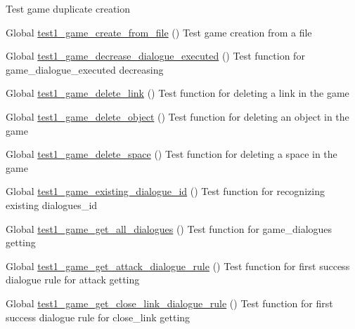 \begin{DoxyRefList}
%
Test game duplicate creation  
\item[Global \mbox{\hyperlink{game__test_8c_a867d2e7bebdfa55ee8b8a73764c46f5b}{test1\+\_\+game\+\_\+create\+\_\+from\+\_\+file}} ()]\label{test__test000141}%
%
Test game creation from a file  
\item[Global \mbox{\hyperlink{game__test_8c_aeb32195428035569b401f2b69428a06c}{test1\+\_\+game\+\_\+decrease\+\_\+dialogue\+\_\+executed}} ()]\label{test__test000307}%
%
Test function for game\+\_\+dialogue\+\_\+executed decreasing  
\item[Global \mbox{\hyperlink{game__test_8c_a6dd3ea94576956995ca0318c136d65ab}{test1\+\_\+game\+\_\+delete\+\_\+link}} ()]\label{test__test000227}%
%
Test function for deleting a link in the game  
\item[Global \mbox{\hyperlink{game__test_8c_a22a6d817f1e2da55f5f6360afea2569a}{test1\+\_\+game\+\_\+delete\+\_\+object}} ()]\label{test__test000190}%
%
Test function for deleting an object in the game  
\item[Global \mbox{\hyperlink{game__test_8c_a6cd694817c7d99e41c64b0696ef930d7}{test1\+\_\+game\+\_\+delete\+\_\+space}} ()]\label{test__test000215}%
%
Test function for deleting a space in the game  
\item[Global \mbox{\hyperlink{game__test_8c_a8975e6a77c93158d3c75810369d1f8c0}{test1\+\_\+game\+\_\+existing\+\_\+dialogue\+\_\+id}} ()]\label{test__test000286}%
%
Test function for recognizing existing dialogues\+\_\+id  
\item[Global \mbox{\hyperlink{game__test_8c_aae8bc198e3ede4e27fc2dbb02c5dd020}{test1\+\_\+game\+\_\+get\+\_\+all\+\_\+dialogues}} ()]\label{test__test000392}%
%
Test function for game\+\_\+dialogues getting  
\item[Global \mbox{\hyperlink{game__test_8c_a397a53542d4f71c21160aabaf6c04287}{test1\+\_\+game\+\_\+get\+\_\+attack\+\_\+dialogue\+\_\+rule}} ()]\label{test__test000331}%
%
Test function for first success dialogue rule for attack getting  
\item[Global \mbox{\hyperlink{game__test_8c_a150bdf5b6e6fbf389a239ce96f1dbc64}{test1\+\_\+game\+\_\+get\+\_\+close\+\_\+link\+\_\+dialogue\+\_\+rule}} ()]\label{test__test000377}%
%
Test function for first success dialogue rule for close\+\_\+link getting  

\end{DoxyRefList}
